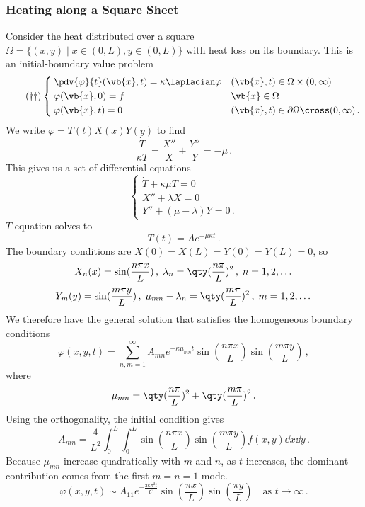 \documentclass{article}
\theoremstyle{plain}\theoremheaderfont{\normalfont\itshape}\theorembodyfont{\rmfamily}\theoremseparator{.}\newtheorem*{rem}{Remark}\newtheorem*{ex}{Example}\newtheorem*{proof}{Proof}\newtheorem*{altp}{Alternative proof}
\theoremstyle{plain}\theoremheaderfont{\normalfont\bfseries}\theorembodyfont{\rmfamily}\theoremseparator{.}\newtheorem{thm}{Theorem}[section]\newtheorem{lem}[thm]{Lemma}\newtheorem{prop}[thm]{Proposition}\newtheorem*{cor}{Corollary}\newtheorem{defn}[thm]{Definition}\newtheorem{clm}[thm]{Claim}\newtheorem{clminproof}{Claim}
\theoremstyle{break}\theoremheaderfont{\normalfont\itshape}\theorembodyfont{\rmfamily}\theoremseparator{.\medskip}\newtheorem*{proofskip}{Proof}\newtheorem*{exs}{Examples}\newtheorem*{rems}{Remarks}
\theoremstyle{break}\theoremheaderfont{\normalfont\bfseries}\theorembodyfont{\rmfamily}\theoremseparator{.\medskip}\newtheorem{lemskip}[thm]{Lemma}\newtheorem{defnskip}[thm]{Definition}\newtheorem{propskip}[thm]{Proposition}\newtheorem{thmskip}[thm]{Theorem}
\numberwithin{equation}{section}
\begin{document}
	\subsubsection{Heating along a Square Sheet}
	Consider the heat distributed over a square \(\Omega=\{(x,y)\mid x\in(0,L),y\in(0,L)\}\) with heat loss on its boundary. This is an initial-boundary value problem
	\begin{equation}\tag{\(\dagger\dagger\)}
		\left\{\begin{aligned}
			& \;\pdv{\varphi}{t}(\vb{x},t)=\kappa\laplacian\varphi && (\vb{x},t)\in\Omega\times(0,\infty)\\
			& \;\varphi(\vb{x},0)=f && \vb{x}\in\Omega\\
			& \;\varphi(\vb{x},t)=0 && (\vb{x},t)\in\partial\Omega\cross(0,\infty)\,.
		\end{aligned}\right.
	\end{equation}
	We write \(\varphi=T(t)X(x)Y(y)\) to find
	\[\frac{\dot{T}}{\kappa T}=\frac{X''}{X}+\frac{Y''}{Y}=-\mu\,.\]
	This gives us a set of differential equations
	\[\begin{cases}
		\dot{T}+\kappa\mu T=0\\
		X''+\lambda X=0\\
		Y''+(\mu-\lambda)Y=0\,.
	\end{cases}\]
	\(T\) equation solves to
	\[T(t)=Ae^{-\mu\kappa t}\,.\]
	The boundary conditions are \(X(0)=X(L)=Y(0)=Y(L)=0\), so
	\[X_n(x)=\sin(\frac{n\pi x}{L})\,,\;\lambda_n=\qty(\frac{n\pi}{L})^2\,,\;n=1,2,\dots\]
	\[Y_m(y)=\sin(\frac{m\pi y}{L})\,,\;\mu_{mn}-\lambda_n=\qty(\frac{m\pi}{L})^2\,,\;m=1,2,\dots\]
	We therefore have the general solution that satisfies the homogeneous boundary conditions
	\[\varphi(x,y,t)=\sum_{n,m=1}^{\infty}A_{mn}e^{-\kappa\mu_{mn}t}\sin(\frac{n\pi x}{L})\sin(\frac{m\pi y}{L})\,,\]
	where
	\[\mu_{mn}=\qty(\frac{n\pi}{L})^2+\qty(\frac{m\pi}{L})^2\,.\]
	Using the orthogonality, the initial condition gives
	\[A_{mn}=\frac{4}{L^2}\int_{0}^{L}\int_{0}^{L}\sin(\frac{n\pi x}{L})\sin(\frac{m\pi y}{L})f(x,y)\dd{x}\dd{y}\,.\]
	Because \(\mu_{mn}\) increase quadratically with \(m\) and \(n\), as \(t\) increases, the dominant contribution comes from the first \(m=n=1\) mode.
	\[\varphi(x,y,t)\sim A_{11}e^{-\frac{2\kappa\pi^2 t}{L^2}}\sin(\frac{\pi x}{L})\sin(\frac{\pi y}{L})\quad\text{as }t\to\infty\,.\]
\end{document}
